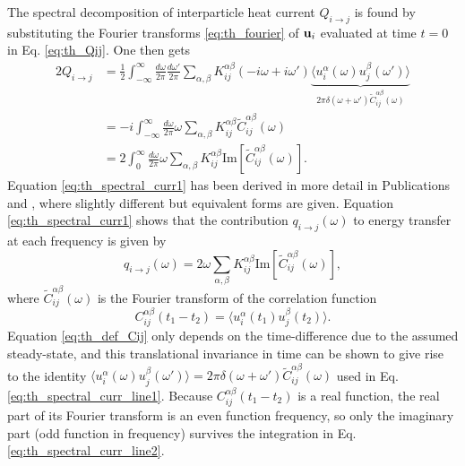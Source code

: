The spectral decomposition of interparticle heat current $Q_{i\to j}$ is found  by substituting the Fourier transforms \eqref{eq:th_fourier} of $\mathbf{u}_i$ evaluated at time $t=0$ in Eq. \eqref{eq:th_Qij}. One then gets
\begin{alignat}{2}
 Q_{i\to j} &= \frac{1}{2} \int_{-\infty}^{\infty} \frac{d\omega}{2\pi} \frac{d\omega'}{2\pi} \sum_{\alpha,\beta} K_{ij}^{\alpha\beta} (-i\omega+i\omega') \underbrace{\langle u_i^{\alpha}(\omega) u_j^{\beta}(\omega') \rangle}_{2\pi \delta(\omega+\omega')\tilde C_{ij}^{\alpha\beta}(\omega)} \label{eq:th_spectral_curr_line1} \\
  &= -i   \int_{-\infty}^{\infty} \frac{d\omega}{2\pi} \omega \sum_{\alpha,\beta} K_{ij}^{\alpha\beta} \tilde C_{ij}^{\alpha\beta}(\omega) \label{eq:th_spectral_curr_line2} \\
  &=  2 \int_{0}^{\infty}\frac{d\omega}{2\pi} \omega \sum_{\alpha,\beta} K_{ij}^{\alpha\beta} \textrm{Im}[\tilde C_{ij}^{\alpha\beta}(\omega)]. \label{eq:th_spectral_curr1}
\end{alignat}
Equation \eqref{eq:th_spectral_curr1} has been derived in more detail in Publications  and , where slightly different but equivalent forms are given. Equation \eqref{eq:th_spectral_curr1} shows that the contribution $q_{i\to j}(\omega)$ to energy transfer at each frequency is given by 
\begin{equation}
 q_{i\to j}(\omega) = 2  \omega \sum_{\alpha,\beta} K_{ij}^{\alpha\beta} \textrm{Im}[\tilde C_{ij}^{\alpha\beta}(\omega)], \label{eq:th_spectral_curr}
\end{equation}
where $\tilde C_{ij}^{\alpha\beta}(\omega)$ is the Fourier transform of the correlation function
\begin{equation}
 C_{ij}^{\alpha\beta}(t_1-t_2) = \langle u_i^{\alpha}(t_1)u_j^{\beta}(t_2) \rangle. \label{eq:th_def_Cij} 
\end{equation}
Equation \eqref{eq:th_def_Cij} only depends on the time-difference due to the assumed steady-state, and this translational invariance in time can be shown to give rise to the identity $\langle u_i^{\alpha}(\omega) u_j^{\beta}(\omega') \rangle = 2\pi \delta(\omega+\omega')\tilde C_{ij}^{\alpha\beta}(\omega)$ used in Eq. \eqref{eq:th_spectral_curr_line1}. Because $C_{ij}^{\alpha\beta}(t_1-t_2)$ is a real function, the real part of its Fourier transform is an even function frequency, so only the imaginary part (odd function in frequency) survives the integration in Eq. \eqref{eq:th_spectral_curr_line2}. 

